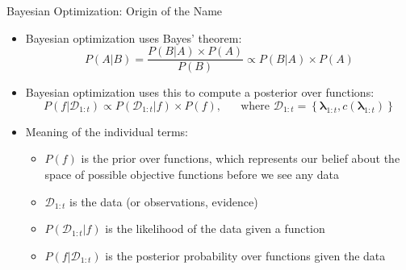 \documentclass[aspectratio=169]{../latex_main/tntbeamer}  %
\newcommand{\conf}[0]{\pmb{\lambda}}
\newcommand{\dataset}[0]{\mathcal{D}}
\newcommand{\cost}[0]{c}
\newcommand{\bocount}{t}
\newcommand{\func}[0]{f}
\begin{document}
\begin{frame}[c]{Bayesian Optimization: Origin of the Name}

\begin{itemize}
    \item Bayesian optimization uses \alert{Bayes' theorem}: 
    	\begin{equation*}
    	    P(A \vert B) = \frac{P(B \vert A) \times  P(A)}{P(B)}
    	    \propto P(B \vert A) \times  P(A)
    	\end{equation*} 
    \item Bayesian optimization uses this to compute a posterior over functions: 
        \begin{equation*}
            P(\func \vert \dataset_{1:\bocount}) \propto P(\dataset_{1:\bocount} \vert \func) \times P(\func), \text{~~~~ where } \dataset_{1:\bocount} = \left \{ \conf_{1:\bocount}, \cost(\conf_{1:\bocount}) \right\}
        \end{equation*} 
\pause
\vspace*{-0.5cm}
    \item Meaning of the individual terms:
        \begin{itemize}
            \item $P(f)$ is the \alert{prior} over functions, which represents our belief about the space of possible objective functions \alert{before} we see any data
            \item $\dataset_{1:\bocount}$ is the \alert{data} (or observations, evidence)
            \item $P(\dataset_{1:\bocount} \vert \func)$ is the likelihood of the data given a function
            \item $P(\func \vert \dataset_{1:\bocount})$ is the \alert{posterior} probability over functions given the data
        \end{itemize}
    \end{itemize}
\end{frame}
\end{document}
